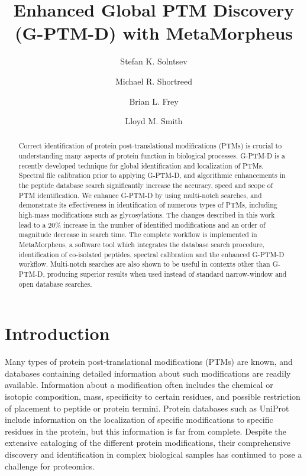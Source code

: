 \documentclass[journal=jprobs,manuscript=article]{achemso}
\author{Stefan K. Solntsev}
\author{Michael R. Shortreed}
\author{Brian L. Frey}
\author{Lloyd M. Smith}
\affiliation[UwMadison]
{University of Wisconsin-Madison}
\title{Enhanced Global PTM Discovery (G-PTM-D) with MetaMorpheus}
\begin{document}
	

\sloppy

\begin{abstract}

Correct identification of protein post-translational modifications (PTMs) is crucial to understanding many aspects of protein function in biological processes.
G-PTM-D is a recently developed technique for global identification and localization of PTMs.
Spectral file calibration prior to applying G-PTM-D, and algorithmic enhancements in the peptide database search significantly increase the accuracy, speed and scope of PTM identification.
We enhance G-PTM-D by using multi-notch searches, and demonstrate its effectiveness in identification of numerous types of PTMs, including high-mass modifications such as glycosylations.
The changes described in this work lead to a 20\% increase in the number of identified modifications and an order of magnitude decrease in search time.
The complete workflow is implemented in MetaMorpheus, a software tool which integrates the database search procedure, identification of co-isolated peptides, spectral calibration and the enhanced G-PTM-D workflow.
Multi-notch searches are also shown to be useful in contexts other than G-PTM-D, producing superior results when used instead of standard narrow-window and open database searches.
\end{abstract}

\section{Introduction}

Many types of protein post-translational modifications (PTMs) are known, and databases containing detailed information about such modifications are readily available\citep{Creasy_2004}.
Information about a modification often includes the chemical or isotopic composition, mass, specificity to certain residues, and possible restriction of placement to peptide or protein termini.
Protein databases such as UniProt\citep{Uniprot_2017} include information on the localization of specific modifications to specific residues in the protein, but this information is far from complete.
Despite the extensive cataloging of the different protein modifications, their comprehensive discovery and identification in complex biological samples has continued to pose a challenge for proteomics\citep{Olsen_2013}.
\end{document}
